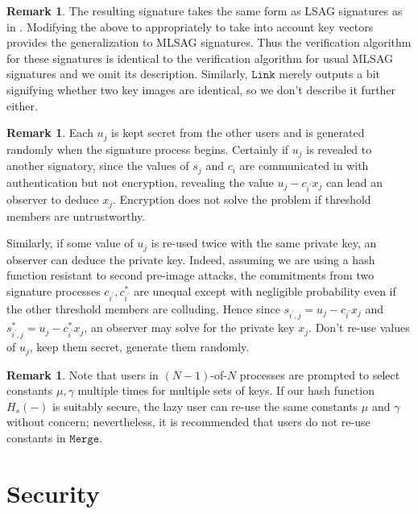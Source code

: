 \documentclass{mrl}
\theoremstyle{definition}
\newtheorem{disc}[theorem]{Remark}
\begin{document}
 
\begin{disc} The resulting signature takes the same form as LSAG signatures as in \cite{liu2004linkable}. Modifying the above to appropriately to take into account key vectors provides the generalization to MLSAG signatures. Thus the verification algorithm for these signatures is identical to the verification algorithm for usual MLSAG signatures and we omit its description. Similarly, $\texttt{Link}$ merely outputs a bit signifying whether two key images are identical, so we don't describe it further either.

\end{disc}


 
 \begin{disc}
 Each $u_j$ is kept secret from the other users and is generated randomly when the signature process begins. Certainly if $u_j$ is revealed to another signatory, since the values of $s_j$ and $c_i$ are communicated in with authentication but not encryption, revealing the value $u_j - c_{i^{\prime}} x_j$ can lead an observer to deduce $x_j$. Encryption does not solve the problem if threshold members are untrustworthy.
 
 
 Similarly, if some value of $u_j$ is re-used twice with the same private key, an observer can deduce the private key. Indeed, assuming we are using a hash function resistant to second pre-image attacks, the commitments from two signature processes $c_{i^{\prime}}, c_{i^{\prime}}^*$ are unequal except with negligible probability even if the other threshold members are colluding. Hence since $s_{i^{\prime},j} = u_j - c_{i^{\prime}} x_{j}$ and $s_{i^{\prime},j}^* = u_j - c_{i^{\prime}}^* x_{j}$, an observer may solve for the private key $x_j$. Don't re-use values of $u_j$, keep them secret, generate them randomly.
 
 \end{disc}
 
 \begin{disc}  Note that users in $(N-1)$-of-$N$ processes are prompted to select constants $\mu, \gamma$ multiple times for multiple sets of keys. If our hash function $H_s(-)$ is suitably secure, the lazy user can re-use the same constants $\mu$ and $\gamma$ without concern; nevertheless, it is recommended that users do not re-use constants in $\texttt{Merge}$. 
 \end{disc}
 
 
 \section{Security}
 
\end{document}
